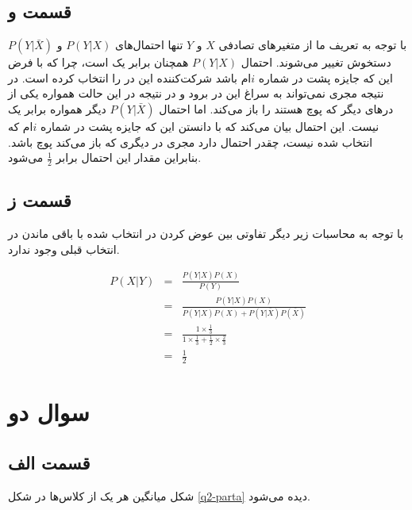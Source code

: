 \documentclass{article}
\begin{document}
\subsection*{قسمت و}

با توجه به تعریف ما از متغیر‌های تصادفی $X$ و $Y$ تنها احتمال‌های $P(Y|X)$ و $P(Y|\bar{X})$ دستخوش
تغییر می‌شوند. احتمال $P(Y|X)$ همچنان برابر یک است، چرا که با فرض این که جایزه پشت در شماره $i$ام باشد
شرکت‌کننده این در را انتخاب کرده است. در نتیجه مجری نمی‌تواند به سراغ این در برود و در نتیجه در این حالت
همواره یکی از در‌های دیگر که پوچ هستند را باز می‌کند. اما احتمال $P(Y|\bar{X})$ دیگر همواره برابر یک نیست.
این احتمال بیان می‌کند که با دانستن این که جایزه پشت در شماره $i$ام که انتخاب شده نیست، چقدر احتمال دارد
مجری در دیگری که باز می‌کند پوچ باشد. بنابراین مقدار این احتمال برابر $\frac{1}{2}$ می‌شود.

\subsection*{قسمت ز}

با توجه به محاسبات زیر دیگر تفاوتی بین عوض کردن در انتخاب شده با باقی ماندن در انتخاب قبلی وجود ندارد.

\begin{eqnarray*}
    P(X|Y) & = & \frac{P(Y|X) P(X)}{P(Y)} \\
    & = & \frac{P(Y|X) P(X)}{P(Y|X) P(X) + P(Y|\bar{X})P(\bar{X})} \\
    & = & \frac{1 \times \frac{1}{3}}{1 \times \frac{1}{3} + \frac{1}{2} \times \frac{2}{3}} \\
    & = & \frac{1}{2}
\end{eqnarray*}

\section*{سوال دو}

\subsection*{قسمت الف}

شکل میانگین هر یک از کلاس‌ها در شکل \ref{q2-parta} دیده می‌شود.
\end{document}
